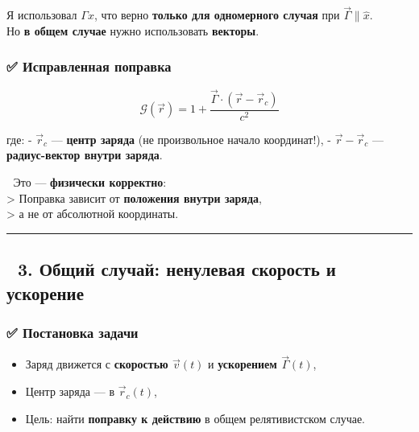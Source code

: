 \documentclass[11pt]{article}
\providecommand{\tightlist}{%
      \setlength{\itemsep}{0pt}\setlength{\parskip}{0pt}}
\begin{document}
Я использовал \(\Gamma x\), что верно \textbf{только для одномерного
случая} при \(\vec{\Gamma} \parallel \hat{x}\).\\
Но \textbf{в общем случае} нужно использовать \textbf{векторы}.

\subsubsection{✅ Исправленная
поправка}\label{ux438ux441ux43fux440ux430ux432ux43bux435ux43dux43dux430ux44f-ux43fux43eux43fux440ux430ux432ux43aux430}

\[
\boxed{
\mathcal{G}(\vec{r}) = 1 + \frac{\vec{\Gamma} \cdot (\vec{r} - \vec{r}_c)}{c^2}
}
\]

где: - \(\vec{r}_c\) --- \textbf{центр заряда} (не произвольное начало
координат!), - \(\vec{r} - \vec{r}_c\) --- \textbf{радиус-вектор внутри
заряда}.

📌 Это --- \textbf{физически корректно}:\\
\textgreater{} Поправка зависит от \textbf{положения внутри заряда},\\
\textgreater{} а не от абсолютной координаты.

\begin{center}\rule{0.5\linewidth}{\linethickness}\end{center}

\subsection{🔹 3. Общий случай: ненулевая скорость и
ускорение}\label{ux43eux431ux449ux438ux439-ux441ux43bux443ux447ux430ux439-ux43dux435ux43dux443ux43bux435ux432ux430ux44f-ux441ux43aux43eux440ux43eux441ux442ux44c-ux438-ux443ux441ux43aux43eux440ux435ux43dux438ux435}

\subsubsection{✅ Постановка
задачи}\label{ux43fux43eux441ux442ux430ux43dux43eux432ux43aux430-ux437ux430ux434ux430ux447ux438-1}

\begin{itemize}
\tightlist
\item
  Заряд движется с \textbf{скоростью \(\vec{v}(t)\)} и
  \textbf{ускорением \(\vec{\Gamma}(t)\)},
\item
  Центр заряда --- в \(\vec{r}_c(t)\),
\item
  Цель: найти \textbf{поправку к действию} в общем релятивистском
  случае.
\end{itemize}
\end{document}
